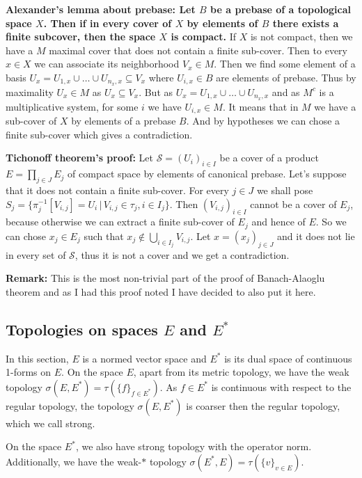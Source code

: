 \documentclass{article}
\begin{document}
\textbf{Alexander's lemma about prebase: Let $B$ be a prebase of a topological
space $X$. Then if in every cover of $X$ by elements of $B$ there exists a finite
subcover, then the space $X$ is compact.} If $X$ is not compact, then we have
a $M$ maximal cover that does not contain a finite sub-cover. Then to every
$x\in X$ we can associate its neighborhood $V_x\in M$. Then we find some
element of a basis $U_x=U_{1,x}\cup\ldots\cup U_{n_x,x}\subseteq V_x$ where
$U_{i,x}\in B$ are elements of prebase. Thus by maximality $U_x\in M$ as
$U_x\subseteq V_x$. But as $U_x=U_{1,x}\cup\ldots\cup U_{n_x,x}$ and as $M^c$
is a multiplicative system, for some $i$ we have $U_{i,x}\in M$. It means that
in $M$ we have a sub-cover of $X$ by elements of a prebase $B$. And by hypotheses
we can chose a finite sub-cover which gives a contradiction.
\vspace{1ex}

\textbf{Tichonoff theorem's proof:} Let $\mathcal{S}=(U_i)_{i\in I}$ be a cover of a
product $E=\prod_{j\in J} E_j$ of compact space by elements of canonical prebase.
Let's suppose that it does not contain a finite sub-cover. For every $j\in J$
we shall pose $S_j=\{\pi_j^{-1}[V_{i,j}]=U_i\,|\,V_{i,j}\in\tau_j,i\in I_j\}$.
Then $(V_{i,j})_{i\in I}$ cannot be a cover of $E_j$, because otherwise we can
extract a finite sub-cover of $E_j$ and hence of $E$. So we can chose $x_j\in
E_j$ such that $x_j\notin\bigcup_{i\in I_j}V_{i,j}$. Let $x=(x_j)_{j\in J}$ and
it does not lie in every set of $\mathcal{S}$, thus it is not a cover and we get
a contradiction.

\vspace{1ex}
\textbf{Remark:} This is the most non-trivial part of the proof of Banach-Alaoglu
theorem and as I had this proof noted I have decided to also put it here.

\subsection{Topologies on spaces $E$ and $E^*$}
In this section, $E$ is a normed vector space and $E^*$ is its dual space of continuous
1-forms on $E$. On the space $E$, apart from its metric topology, we have
the weak topology $\sigma(E, E^*)=\tau(\{f\}_{f\in E^*})$. As $f\in E^*$ is
continuous with respect to the regular topology, the topology $\sigma(E, E^*)$
is coarser then the regular topology, which we call strong.
\vspace{1ex}

On the space $E^*$, we also have strong topology with the operator norm.
Additionally, we have the weak-$*$ topology $\sigma(E^*, E)=\tau(\{v\}_{v\in E})$.
\end{document}
